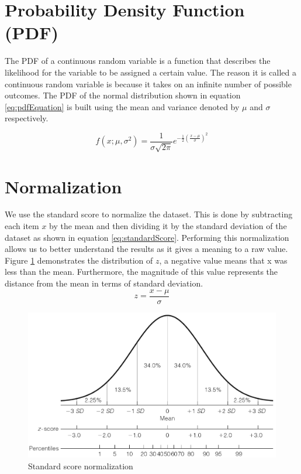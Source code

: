 \documentclass{mproj}
\begin{document}
\section{Probability Density Function (PDF)}
\label{sec:pdf}
The PDF \cite{kolmogorov1960foundations} of a continuous random variable is a function that describes the likelihood for the variable to be assigned a certain value. The reason it is called a continuous random variable is because it takes on an infinite number of possible outcomes. The PDF of the normal distribution shown in equation \ref{eq:pdfEquation} is built using the mean and variance denoted by $\mu$ and $\sigma$ respectively.

\begin{equation}
\label{eq:pdfEquation}
f(x;\mu,\sigma^2) = \frac{1}{\sigma\sqrt{2\pi}}e^{-\frac{1}{2}(\frac{x-\mu}{\sigma})^2}
\end{equation}

\section{Normalization}
We use the standard score \cite{normalization} to normalize the dataset. This is done by subtracting each item $x$ by the mean and then dividing it by the standard deviation of the dataset as shown in equation \ref{eq:standardScore}. Performing this normalization allows us to better understand the results as it gives a meaning to a raw value. Figure \ref{fig:zscore} demonstrates the distribution of $z$, a negative value means that x was less than the mean. Furthermore, the magnitude of this value represents the distance from the mean in terms of standard deviation.
\begin{equation}
\label{eq:standardScore}
z= \frac{x - \mu}{\sigma}
\end{equation}
\begin{figure}[H]
\caption{Standard score normalization \cite{normalization}}
\label{fig:zscore}
\centerline{\includegraphics[scale=0.4]{zscore}}
\end{figure}
\end{document}
